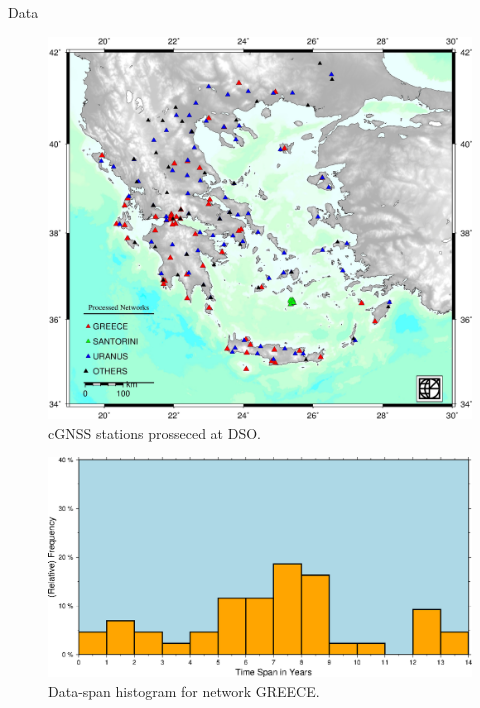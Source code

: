 \documentclass[final,a0,portrait]{beamer}
\newlength{\onecolwid}
\begin{document}
\begin{frame}[t]
\begin{columns}[t]
\begin{column}{\onecolwid}
\begin{block}{Data}
{%
}
\begin{figure}
  \centering
  \includegraphics[width=0.8\onecolwid]{grnets.jpg}
  \caption{cGNSS stations prosseced at DSO.}
  \label{fig:grnets}
\end{figure}
\begin{figure}
    \centering
    \includegraphics[width=.7\linewidth,height=.05\paperheight]{greece-freqs.png}
    \caption{Data-span histogram for network GREECE.}
    \label{fig:grfreq}
\end{figure}
\end{block}


\end{column}
\end{columns}
\end{frame}
\end{document}
